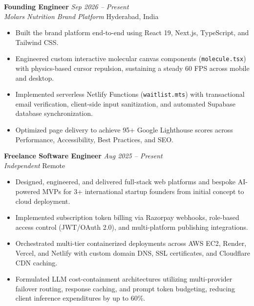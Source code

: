 \documentclass[9.5pt]{article}
\begin{document}
\textbf{Founding Engineer} \hfill \textit{Sep 2026 -- Present} \\
\textit{Molars Nutrition Brand Platform} \hfill Hyderabad, India
\begin{itemize}
  \item Built the brand platform end-to-end using React 19, Next.js, TypeScript, and Tailwind CSS.
  \item Engineered custom interactive molecular canvas components (\texttt{molecule.tsx}) with physics-based cursor repulsion, sustaining a steady 60 FPS across mobile and desktop.
  \item Implemented serverless Netlify Functions (\texttt{waitlist.mts}) with transactional email verification, client-side input sanitization, and automated Supabase database synchronization.
  \item Optimized page delivery to achieve 95+ Google Lighthouse scores across Performance, Accessibility, Best Practices, and SEO.
\end{itemize}

\vspace{2pt}
\textbf{Freelance Software Engineer} \hfill \textit{Aug 2025 -- Present} \\
\textit{Independent} \hfill Remote
\begin{itemize}
  \item Designed, engineered, and delivered full-stack web platforms and bespoke AI-powered MVPs for 3+ international startup founders from initial concept to cloud deployment.
  \item Implemented subscription token billing via Razorpay webhooks, role-based access control (JWT/OAuth 2.0), and multi-platform publishing integrations.
  \item Orchestrated multi-tier containerized deployments across AWS EC2, Render, Vercel, and Netlify with custom domain DNS, SSL certificates, and Cloudflare CDN caching.
  \item Formulated LLM cost-containment architectures utilizing multi-provider failover routing, response caching, and prompt token budgeting, reducing client inference expenditures by up to 60\%.
\end{itemize}
\end{document}
